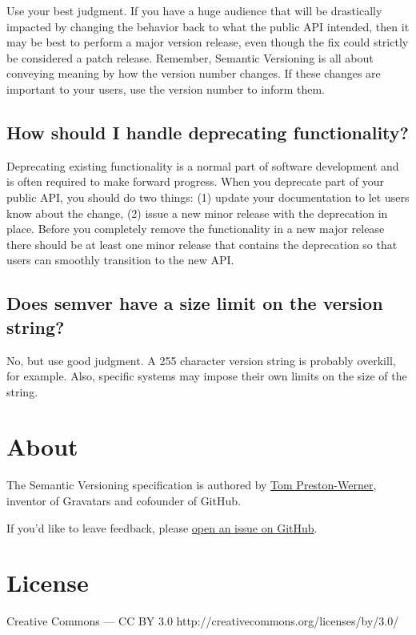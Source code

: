 \documentclass[a4paper,12pt,notitlepage,twoside,openright]{article}
\begin{document}
Use your best judgment. If you have a huge audience that will be
drastically impacted by changing the behavior back to what the public
API intended, then it may be best to perform a major version release,
even though the fix could strictly be considered a patch release.
Remember, Semantic Versioning is all about conveying meaning by how the
version number changes. If these changes are important to your users,
use the version number to inform them.

\hypertarget{how-should-i-handle-deprecating-functionality}{%
\subsection{How should I handle deprecating
functionality?}\label{how-should-i-handle-deprecating-functionality}}

Deprecating existing functionality is a normal part of software
development and is often required to make forward progress. When you
deprecate part of your public API, you should do two things: (1) update
your documentation to let users know about the change, (2) issue a new
minor release with the deprecation in place. Before you completely
remove the functionality in a new major release there should be at least
one minor release that contains the deprecation so that users can
smoothly transition to the new API.

\hypertarget{does-semver-have-a-size-limit-on-the-version-string}{%
\subsection{Does semver have a size limit on the version
string?}\label{does-semver-have-a-size-limit-on-the-version-string}}

No, but use good judgment. A 255 character version string is probably
overkill, for example. Also, specific systems may impose their own
limits on the size of the string.

\hypertarget{about}{%
\section{About}\label{about}}

The Semantic Versioning specification is authored by
\href{http://tom.preston-werner.com}{Tom Preston-Werner}, inventor of
Gravatars and cofounder of GitHub.

If you'd like to leave feedback, please
\href{https://github.com/mojombo/semver/issues}{open an issue on
GitHub}.

\hypertarget{license}{%
\section{License}\label{license}}

Creative Commons --- CC BY 3.0 http://creativecommons.org/licenses/by/3.0/
\end{document}
